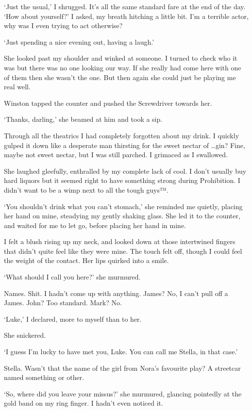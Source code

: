 `Just the usual,' I shrugged. It's all the same standard fare at the
end of the day. `How about yourself?' I asked, my breath hitching a
little bit. I'm a terrible actor, why was I even trying to act
otherwise?

`Just spending a nice evening out, having a laugh.'

She looked past my shoulder and winked at someone. I turned to check
who it was but there was no one looking our way. If she really had
come here with one of them then she wasn't the one. But then again she
could just be playing me real well.

Winston tapped the counter and pushed the Screwdriver towards her.

`Thanks, darling,' she beamed at him and took a sip.

Through all the theatrics I had completely forgotten about my drink. I
quickly gulped it down like a desperate man thirsting for the sweet
nectar of \ldots gin? Fine, maybe not sweet nectar, but I was still
parched. I grimaced as I swallowed.

She laughed gleefully, enthralled by my complete lack of cool. I don't
usually buy hard liquors but it seemed right to have something strong
during Prohibition. I didn't want to be a wimp next to all the tough
guys™.

`You shouldn't drink what you can't stomach,' she reminded me quietly,
placing her hand on mine, steadying my gently shaking glass. She led
it to the counter, and waited for me to let go, before placing her
hand in mine.

I felt a blush rising up my neck, and looked down at those intertwined
fingers that didn't quite feel like they were mine. The touch felt
off, though I could feel the weight of the contact. Her lips quirked
into a smile.

`What should I call you here?' she murmured.

Names. Shit. I hadn't come up with anything. James? No, I can't pull
off a James. John? Too standard. Mark? No.

`Luke,' I declared, more to myself than to her.

She snickered.

`I guess I'm lucky to have met you, Luke. You can call me Stella, in
that case.'

Stella. Wasn't that the name of the girl from Nora's favourite play? A
streetcar named something or other.

`So, where did you leave your missus?' she murmured, glancing
pointedly at the gold band on my ring finger. I hadn't even noticed
it.

